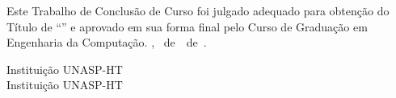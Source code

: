 \imprimircapa


\imprimirfolhaderosto*



\begin{folhadeaprovacao}
	\OnehalfSpacing
	\centering
  	

	\vspace*{250pt}
	Este Trabalho de Conclusão de Curso foi julgado adequado para obtenção do Título de ``\imprimirformacao'' e aprovado em sua forma final pelo Curso de Graduação em Engenharia da Computação.	\imprimirlocal, \imprimirdia~de~\imprimirmes~de~\imprimirano.\\
	
	\vspace*{40pt}
    
	
	\vspace*{24pt}
	\assinatura{\OnehalfSpacing \imprimirbancaa}
	\vspace{6pt}
	Instituição UNASP-HT\\
	
	\vspace*{24pt}
	\assinatura{\OnehalfSpacing \imprimirbancab}
	\vspace{7pt}
	Instituição UNASP-HT\\
	\newpage
	

	
\end{folhadeaprovacao}

\ifnotempty{\imprimirdedicatoriatcc}{
\begin{dedicatoria}
	\vspace*{\fill}
	\noindent
	\begin{adjustwidth*}{8cm}{} 
		\raggedright       
		\imprimirdedicatoriatcc
	\end{adjustwidth*}
	\newpage
\end{dedicatoria}
}

\ifnotempty{\imprimiragradecimentostcc}{
\begin{agradecimentos}
	\imprimiragradecimentostcc
\end{agradecimentos}
}

\ifnotempty{\imprimirepigrafetcc}{
\begin{epigrafe}
	\vspace*{\fill}
	\imprimirepigrafetcc
\end{epigrafe}
}


